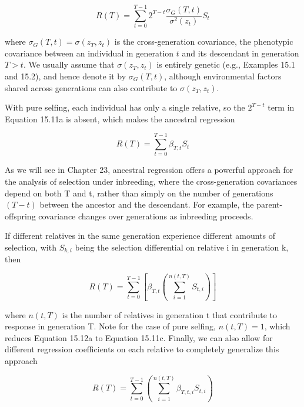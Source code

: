 \documentclass{article}
\begin{document}
\begin{equation}
R(T)=\sum_{t=0}^{T-1}2^{T-t}\frac{\sigma_{G}(T,t)}{\sigma^{2}(z_{t})}S_{t}
\tag{15.11b}
\label{eq:15_11b}
\end{equation}

where  $ \sigma_G(T,t) = \sigma(z_T, z_t) $ is the cross-generation covariance, the phenotypic covariance between an individual in generation  $ t $ and its descendant in generation  $ T > t $. We usually assume that  $ \sigma(z_T, z_t) $ is entirely genetic (e.g., Examples 15.1 and 15.2), and hence denote it by  $ \sigma_G(T,t) $, although environmental factors shared across generations can also contribute to  $ \sigma(z_T, z_t) $.

With pure selfing, each individual has only a single relative, so the  $ 2^{T-t} $ term in Equation 15.11a is absent, which makes the ancestral regression

\begin{equation}
R(T)=\sum_{t=0}^{T-1}\beta_{T,t}S_{t}
\tag{15.11c}
\label{eq:15_11c}
\end{equation}

As we will see in Chapter 23, ancestral regression offers a powerful approach for the analysis of selection under inbreeding, where the cross-generation covariances depend on both T and t, rather than simply on the number of generations  $ (T - t) $ between the ancestor and the descendant. For example, the parent-offspring covariance changes over generations as inbreeding proceeds.

If different relatives in the same generation experience different amounts of selection, with  $ S_{k,i} $ being the selection differential on relative i in generation k, then

\begin{equation}
R(T)=\sum_{t=0}^{T-1}\left[\beta_{T,t}\left(\sum_{i=1}^{n(t,T)}S_{t,i}\right)\right]
\tag{15.12a}
\label{eq:15_12a}
\end{equation}

where  $ n(t,T) $ is the number of relatives in generation t that contribute to response in generation T. Note for the case of pure selfing,  $ n(t,T) = 1 $, which reduces Equation 15.12a to Equation 15.11c. Finally, we can also allow for different regression coefficients on each relative to completely generalize this approach

\begin{equation}
R(T)=\sum_{t=0}^{T-1}\left(\sum_{i=1}^{n(t,T)}\beta_{T,t,i}S_{t,i}\right)
\tag{15.12b}
\label{eq:15_12b}
\end{equation}
\end{document}
